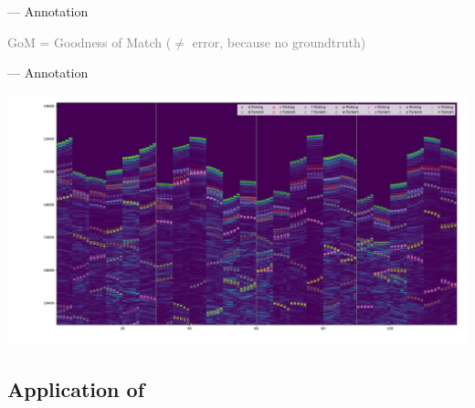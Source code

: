 \begin{frame}[t]{\dechorate --- Annotation}
{\begin{adjustbox}{minipage=.8\textwidth,margin=0pt \smallskipamount,center}
            \vspace{3mm}
            \textcolor{gray}{GoM = Goodness of Match ($\neq$ error, because no groundtruth)}
        \end{adjustbox}
    }

\end{frame}

\begin{frame}{\dechorate --- Annotation}
    \begin{center}
        \includegraphics[trim={10em 0 0 0},clip,width=\linewidth]{figures/dechorate/rir_skyline_final_mod4paper.pdf}
    \end{center}
\end{frame}

\subsection{Application of \dechorate}

